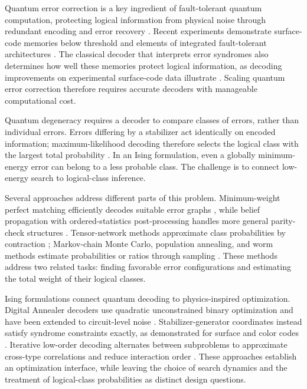 \documentclass[aps,prapplied,reprint,superscriptaddress,amsmath,amssymb,floatfix,nofootinbib]{revtex4-2}
\begin{document}
Quantum error correction is a key ingredient of fault-tolerant quantum
computation, protecting logical information from physical noise through
redundant encoding and error recovery \cite{ref1}. Recent experiments
demonstrate surface-code memories below threshold and elements of
integrated fault-tolerant architectures \cite{ref2,ref3}. The classical decoder
that interprets error syndromes also determines how well these memories
protect logical information, as decoding improvements on experimental
surface-code data illustrate \cite{ref4}. Scaling quantum error correction
therefore requires accurate decoders with manageable computational cost.

Quantum degeneracy requires a decoder to compare classes of errors,
rather than individual errors. Errors differing by a stabilizer act
identically on encoded information; maximum-likelihood decoding
therefore selects the logical class with the largest total probability
\cite{ref5}. In an Ising formulation, even a globally minimum-energy error
can belong to a less probable class. The challenge is to connect
low-energy search to logical-class inference.

Several approaches address different parts of this problem.
Minimum-weight perfect matching efficiently decodes suitable error
graphs \cite{ref6}, while belief propagation with ordered-statistics
post-processing handles more general parity-check structures \cite{ref7}.
Tensor-network methods approximate class probabilities by contraction
\cite{ref8,ref9}; Markov-chain Monte Carlo, population annealing, and worm
methods estimate probabilities or ratios through sampling
\cite{ref10,ref11,ref12}. These methods address two related tasks: finding
favorable error configurations and estimating the total weight of their
logical classes.

Ising formulations connect quantum decoding to physics-inspired
optimization. Digital Annealer decoders use quadratic unconstrained
binary optimization and have been extended to circuit-level noise
\cite{ref13,ref14}. Stabilizer-generator coordinates instead satisfy syndrome
constraints exactly, as demonstrated for surface and color codes
\cite{ref15,ref16}. Iterative low-order decoding alternates between subproblems
to approximate cross-type correlations and reduce interaction order
\cite{ref17}. These approaches establish an optimization interface, while
leaving the choice of search dynamics and the treatment of logical-class
probabilities as distinct design questions.
\end{document}
